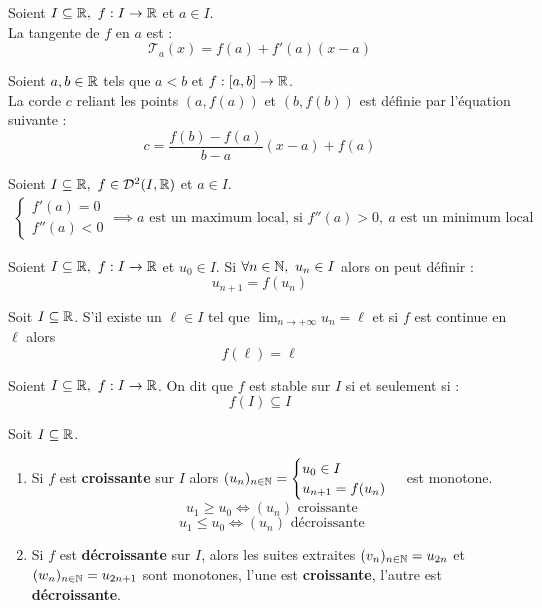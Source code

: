 \begin{proposition}
	Soient $I \subseteq \mathbb{R},\ f : I \to \mathbb{R}$ et $a \in I$.
	\\
	La tangente de $f$ en $a$ est :
	\[ \mathcal{T}_a(x) = f(a) + f'(a)(x - a) \]
\end{proposition}

\begin{proposition}
	Soient $a, b \in \mathbb{R}$ tels que $a < b$ et $f : [a, b] \to \mathbb{R}$.
	\\
	La corde $c$ reliant les points $(a, f(a))$ et $(b, f(b))$ est définie par l'équation suivante :
	\[ c = \frac{f(b) - f(a)}{b - a} (x - a) + f(a) \]
\end{proposition}

\begin{proposition}
	Soient $I \subseteq \mathbb{R},\ f \in \mathcal{D}^2(I, \mathbb{R})$ et $a \in I$.
	\begin{align*}
		\begin{cases}
			f'(a) = 0 \\
			f''(a) < 0
		\end{cases}
		\implies a \text{ est un maximum local, si } f''(a) > 0,\ a \text{  est un minimum local}
	\end{align*}
\end{proposition}

\begin{definition}
	Soient $I \subseteq \mathbb{R},\ f : I \to \mathbb{R}$ et $u_0 \in I$.
	Si $\forall n \in \mathbb{N},\ u_n \in I$ alors on peut définir :
	\[ u_{n + 1} = f(u_n) \]
\end{definition}

\begin{lemma}
	Soit $I \subseteq \mathbb{R}$. S'il existe un $\ell \in I$ tel que $\lim_{n \to +\infty} u_n = \ell$ et si $f$ est continue en $\ell$ alors 
	\[ f(\ell) = \ell \]
\end{lemma}

\begin{definition}
	Soient $I \subseteq \mathbb{R},\ f : I \to \mathbb{R}$. On dit que $f$ est stable sur $I$ si et seulement si : 
	\[ f(I) \subseteq I \]
\end{definition}

\begin{proposition}
	Soit $I \subseteq \mathbb{R}$.
	\begin{enumerate}
		\item Si $f$ est \textbf{croissante} sur $I$ alors 
		$
		(u_n)_{n \in \mathbb{N}} = 
		\begin{cases}
			u_0 \in I \\
			u_{n + 1} = f(u_n)
		\end{cases}
		$
		est monotone.
		\[ u_1 \geq u_0 \iff (u_n) \text{ croissante} \]
		\[ u_1 \leq u_0 \iff (u_n) \text{ décroissante} \]
		\item Si $f$ est \textbf{décroissante} sur $I$, alors les suites extraites $(v_n)_{n \in \mathbb{N}} = u_{2n}$ et $(w_n)_{n \in \mathbb{N}} = u_{2n + 1}$ sont monotones, l'une est \textbf{croissante}, l'autre est \textbf{décroissante}.
	\end{enumerate}
\end{proposition}

